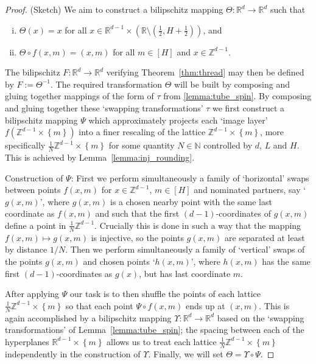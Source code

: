 \documentclass[a4paper, bibliography=totoc]{scrartcl}
\numberwithin{claimcounter}{define}
\newcommand{\R}{\mathbb{R}}
\newcommand{\Z}{\mathbb{Z}}
\newcommand{\N}{\mathbb{N}}
\newcommand{\set}[1]{\left\{#1\right\}}
\newcommand{\br}[1]{\left(#1\right)}
\begin{document}
\begin{proof}(Sketch)
	We aim to construct a bilipschitz mapping $\Theta\colon \R^{d}\to\R^{d}$ such that
	\begin{enumerate}[(i)]
		\item $\Theta(x)=x$ for all $x\in\R^{d-1}\times \br{\R\setminus \br{\frac{1}{2},H+\frac{1}{2}}}$, and
		\item $\Theta\circ f(x,m)=(x,m)$ for all $m\in [H]$ and $x\in\Z^{d-1}$.
	\end{enumerate}
	The bilipschitz $F\colon\R^{d}\to\R^{d}$ verifying Theorem~\ref{thm:thread} may then be defined by $F:=\Theta^{-1}$. The required transformation $\Theta$ will be built by composing and gluing together mappings of the form of $\tau$ from \ref{lemma:tube_spin}. By composing and gluing together these `swapping transformations' $\tau$ we first construct a bilipschitz mapping $\Psi$ which approximately projects each `image layer' $f(\Z^{d-1}\times\set{m})$ into a finer rescaling of the lattice $\Z^{d-1}\times\set{m}$, more specifically $\frac{1}{N}\Z^{d-1}\times\set{m}$ for some quantity $N\in\N$ controlled by $d$, $L$ and $H$. This is achieved by Lemma~\ref{lemma:inj_rounding}. 
	
	Construction of $\Psi$: First we perform simultaneously a family of `horizontal' swaps between points $f(x,m)$ for $x\in \Z^{d-1}$, $m\in[H]$ and nominated partners, say `$g(x,m)$', where $g(x,m)$ is a chosen nearby point with the same last coordinate as $f(x,m)$ and such that the first $(d-1)$-coordinates of $g(x,m)$ define a point in $\frac{1}{N}\Z^{d-1}$. Crucially this is done in such a way that the mapping $f(x,m)\mapsto g(x,m)$ is injective, so the points $g(x,m)$ are separated at least by distance $1/N$. Then we perform simultaneously a family of `vertical' swaps of the points $g(x,m)$ and chosen points `$h(x,m)$', where $h(x,m)$ has the same first $(d-1)$-coordinates as $g(x)$, but has last coordinate $m$.  
	
	
	After applying $\Psi$ our task is to then shuffle the points of each lattice $\frac{1}{N}\Z^{d-1}\times\set{m}$ so that each point $\Psi\circ f(x,m)$ ends up at $(x,m)$.
	This is again accomplished by a bilipschitz mapping $\Upsilon\colon\R^{d}\to\R^{d}$ based on the `swapping transformations' of Lemma~\ref{lemma:tube_spin}; the spacing between each of the hyperplanes $\R^{d-1}\times\set{m}$ allows us to treat each lattice $\frac{1}{N}\Z^{d-1}\times\set{m}$ independently in the construction of $\Upsilon$. Finally, we will set $\Theta=\Upsilon \circ \Psi$. 
	

\end{proof}
\end{document}
